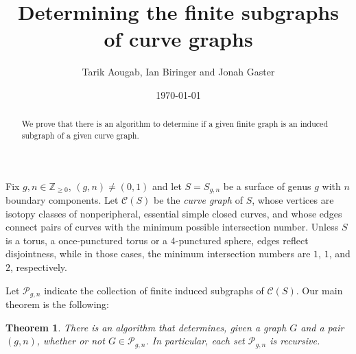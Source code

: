 \documentclass[11pt]{amsart}
\newtheorem{theorem}{Theorem}[section]
\theoremstyle{remark}
\numberwithin{equation}{section}
\newcommand{\Z}{\mathbb{Z}}
\newcommand{\cC}{\mathcal{C}}
\newcommand{\cP}{\mathcal{P}}
\begin{document}
\title[determining the finite subgraphs of curve graphs]{Determining the finite subgraphs\\ of curve graphs}
\author[Aougab, Biringer, Gaster]{Tarik Aougab,  Ian Biringer and Jonah Gaster}
\date{\today}




\begin{abstract}

We prove that there is an algorithm to determine if a given finite graph is an induced subgraph of a given curve graph.

\end{abstract}

\maketitle



Fix $g,n \in \Z_{\ge0}$, $(g,n)\neq (0,1)$ and let $S=S_{g,n}$ be a surface of genus $g$ with $n$ boundary components.  
Let $\cC(S)$ be the \emph{curve graph} of $S$, whose vertices are isotopy classes of nonperipheral, essential simple closed curves, %
and whose edges connect pairs of curves with the minimum possible intersection number. Unless $S$ is a torus, a once-punctured torus or a $4$-punctured sphere, edges reflect disjointness, while in those cases, the minimum intersection numbers are $1$, $1$, and $2$, respectively.  

Let $\cP_{g,n}$ indicate the collection of finite induced subgraphs of $\cC(S)$.
Our main theorem is the following:

\begin{theorem}
\label{main thm}
There is an algorithm that determines, given a graph $G$ and a pair $(g,n)$, whether or not $G\in \cP_{g,n}$.
In particular, each set $\cP_{g,n}$ is recursive.
\end{theorem}
\end{document}
